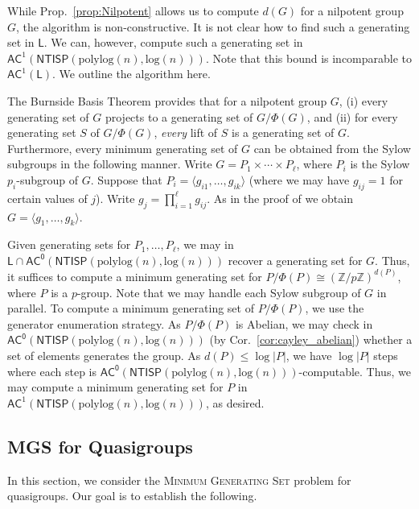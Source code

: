 \documentclass{theoretics}
\newcommand{\algprobm}[1]{\textsc{#1}\xspace}
\newcommand{\Cor}[1]{Cor.~\ref{#1}\xspace}
\newcommand{\Prop}[1]{Prop.~\ref{#1}\xspace}
\newcommand*{\ComplexityClass}[1]{\ensuremath{\mathsf{#1}}\xspace}
\newcommand{\NTISP}{\ComplexityClass{NTISP}}
\newcommand{\NTISPpll}{\ensuremath{\NTISP(\mathrm{polylog}(n),\mathrm{log}(n))}\xspace}
\newcommand*{\LogSpace}{\ComplexityClass{L}}
\newcommand{\AC}{\ComplexityClass{AC}}
\newcommand{\ACz}{\ComplexityClass{AC^0}}
\begin{document}
\begin{remark}
While \Prop{prop:Nilpotent} allows us to compute $d(G)$ for a nilpotent group $G$, the algorithm is non-constructive. It is not clear how to find such a generating set in $\LogSpace$. We can, however, compute such a generating set in  $\AC^{1}(\NTISPpll)$. Note that this bound is incomparable to $\AC^{1}(\LogSpace)$. We outline the algorithm here. 

The Burnside Basis Theorem provides that for a nilpotent group $G$, (i) every generating set of $G$ projects to a generating set of $G/\Phi(G)$, and (ii) for every generating set $S$ of $G/\Phi(G)$, \emph{every} lift of $S$ is a generating set of $G$. Furthermore, every minimum generating set of $G$ can be obtained from the Sylow subgroups in the following manner. Write $G = P_{1} \times \cdots \times P_{\ell}$, where $P_{i}$ is the Sylow $p_{i}$-subgroup of $G$. Suppose that $P_{i} = \langle g_{i1}, \ldots, g_{ik}\rangle$ (where we may have $g_{ij} = 1$ for certain values of $j$). Write $g_{j} = \prod_{i=1}^{\ell} g_{ij}$. As in the proof of \cite[Theorem~7]{ArvindToran} we obtain $G = \langle g_{1}, \ldots, g_{k} \rangle.$

Given generating sets for $P_{1}, \ldots, P_{\ell}$, we may in $\LogSpace \cap \ACz(\NTISPpll)$ recover a generating set for $G$. Thus, it suffices to compute a minimum generating set for $P/\Phi(P) \cong (\mathbb{Z}/p\mathbb{Z})^{d(P)}$, where $P$ is a $p$-group.  Note that we may handle each Sylow subgroup of $G$ in parallel. To compute a minimum generating set of $P/\Phi(P)$, we use the generator enumeration strategy. As $P/\Phi(P)$ is Abelian, we may check in $\ACz(\NTISPpll)$ (by \Cor{cor:cayley_abelian}) whether a set of elements generates the group. As $d(P) \leq \log |P|$, we have $\log |P|$ steps where each step is $\ACz(\NTISPpll)$-computable. Thus, we may compute a minimum generating set for $P$ in $\AC^{1}(\NTISPpll)$, as desired. 
\end{remark}





\iffalse
\subsection{\algprobm{MGS} for Quasigroups}
In this section, we consider the \algprobm{Minimum Generating Set} problem for quasigroups. Our goal is to establish the following.
\end{document}

